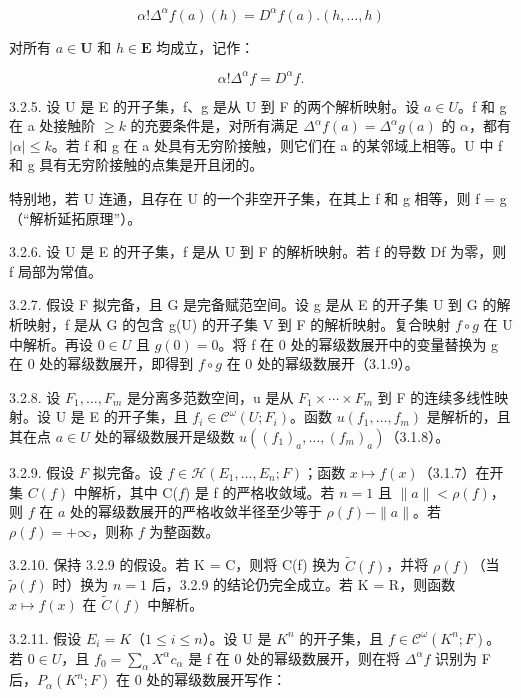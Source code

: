 \[
\alpha ! \Delta^ {\alpha} f (a) (h) = D ^ {\alpha} f (a). (h, \dots , h)
\]

对所有 \(a \in \mathbf{U}\) 和 \(h \in \mathbf{E}\) 均成立，记作：

\[
\alpha ! \Delta^ {\alpha} f = D ^ {\alpha} f.
\]

3.2.5. 设 U 是 E 的开子集，f、g 是从 U 到 F 的两个解析映射。设 \(a \in U\)。f 和 g 在 a 处接触阶 \(\geqslant k\) 的充要条件是，对所有满足 \(\Delta^{\alpha}f(a) = \Delta^{\alpha}g(a)\) 的 \(\alpha\)，都有 \(|\alpha| \leqslant k\)。若 f 和 g 在 a 处具有无穷阶接触，则它们在 a 的某邻域上相等。U 中 f 和 g 具有无穷阶接触的点集是开且闭的。

特别地，若 U 连通，且存在 U 的一个非空开子集，在其上 f 和 g 相等，则 f = g（“解析延拓原理”）。

3.2.6. 设 U 是 E 的开子集，f 是从 U 到 F 的解析映射。若 f 的导数 Df 为零，则 f 局部为常值。

3.2.7. 假设 F 拟完备，且 G 是完备赋范空间。设 g 是从 E 的开子集 U 到 G 的解析映射，f 是从 G 的包含 g(U) 的开子集 V 到 F 的解析映射。复合映射 \(f \circ g\) 在 U 中解析。再设 \(0 \in U\) 且 \(g(0) = 0\)。将 f 在 0 处的幂级数展开中的变量替换为 g 在 0 处的幂级数展开，即得到 \(f \circ g\) 在 0 处的幂级数展开（3.1.9）。

3.2.8. 设 \(F_{1},\ldots,F_{m}\) 是分离多范数空间，u 是从 \(F_{1}\times\cdots\times F_{m}\) 到 F 的连续多线性映射。设 U 是 E 的开子集，且 \(f_{i}\in\mathcal{C}^{\omega}(U;F_{i})\)。函数 \(u(f_{1},\ldots,f_{m})\) 是解析的，且其在点 \(a\in U\) 处的幂级数展开是级数 \(u((f_{1})_{a},\ldots,(f_{m})_{a})\)（3.1.8）。

3.2.9. 假设 \(F\) 拟完备。设 \(f \in \mathcal{H}(E_1, \ldots, E_n; F)\)；函数 \(x \mapsto f(x)\)（3.1.7）在开集 \(C(f)\) 中解析，其中 C(\(f\)) 是 f 的严格收敛域。若 \(n = 1\) 且 \(\|a\| < \rho(f)\)，则 \(f\) 在 \(a\) 处的幂级数展开的严格收敛半径至少等于 \(\rho(f) - \|a\|\)。若 \(\rho(f) = +\infty\)，则称 \(f\) 为整函数。

3.2.10. 保持 3.2.9 的假设。若 K = C，则将 C(f) 换为 \(\tilde{C}(f)\)，并将 \(\rho(f)\)（当 \(\tilde{\rho}(f)\) 时）换为 \(n = 1\) 后，3.2.9 的结论仍完全成立。若 K = R，则函数 \(x \mapsto f(x)\) 在 \(\tilde{C}(f)\) 中解析。

3.2.11. 假设 \(E_{i} = K\)（\(1 \leqslant i \leqslant n\)）。设 U 是 \(K^{n}\) 的开子集，且 \(f \in \mathcal{C}^{\omega}(K^{n}; F)\)。若 \(0 \in U\)，且 \(f_{0} = \sum_{\alpha} X^{\alpha} c_{\alpha}\) 是 f 在 0 处的幂级数展开，则在将 \(\Delta^{\alpha} f\) 识别为 F 后，\(P_{\alpha}(K^{n}; F)\) 在 0 处的幂级数展开写作：

